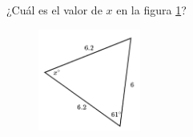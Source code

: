 \question[15]  ¿Cuál es el valor de $x$ en la figura \ref{fig:findangle04}?
\begin{figure}[H]
    \begin{center}
        \includegraphics[width=0.3\textwidth]{../images/findangle04.png}
    \end{center}
    \caption{}
    \label{fig:findangle04}
\end{figure}